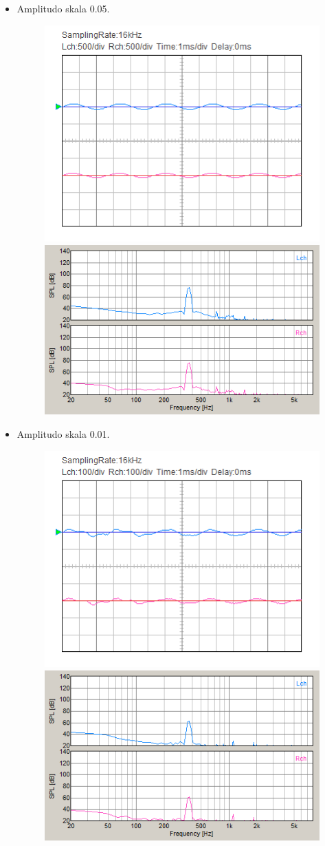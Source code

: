 \documentclass[12pt,]{article}
\begin{document}
\begin{itemize}
\begin{itemize}
\begin{itemize}
			\item Amplitudo skala 0.05.
			\begin{figure}[H]
				\centering
				\includegraphics[width=0.45\linewidth]{result/day_3/400_Hz/osi_tone005}
				\includegraphics[width=0.45\linewidth]{result/day_3/400_Hz/fft_tone005}
			\end{figure}
		
			\item Amplitudo skala 0.01.
			\begin{figure}[H]
				\centering
				\includegraphics[width=0.45\linewidth]{result/day_3/400_Hz/osi_tone001}
				\includegraphics[width=0.45\linewidth]{result/day_3/400_Hz/fft_tone001}
			\end{figure}
		

\end{itemize}
\end{itemize}
\end{itemize}
\end{document}
